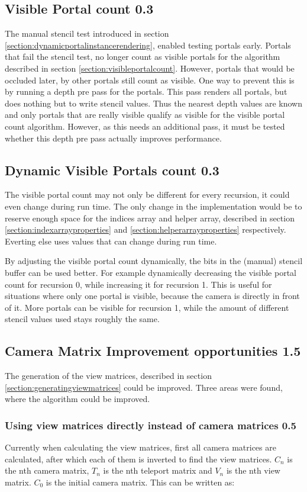 \subsection{Visible Portal count 0.3}
The manual stencil test introduced in section \ref{section:dynamicportalinstancerendering}, enabled testing portals early. Portals that fail the stencil test, no longer count as visible portals for the algorithm described in section \ref{section:visibleportalcount}. However, portals that would be occluded later, by other portals still count as visible. One way to prevent this is by running a depth pre pass for the portals. This pass renders all portals, but does nothing but to write stencil values. Thus the nearest depth values are known and only portals that are really visible qualify as visible for the visible portal count algorithm. However, as this needs an additional pass, it must be tested whether this depth pre pass actually improves performance.

\subsection{Dynamic Visible Portals count 0.3}
The visible portal count may not only be different for every recursion, it could even change during run time. The only change in the implementation would be to reserve enough space for the indices array and helper array, described in section \ref{section:indexarrayproperties} and \ref{section:helperarrayproperties} respectively. Everting else uses values that can change during run time.

By adjusting the visible portal count dynamically, the bits in the (manual) stencil buffer can be used better. For example dynamically decreasing the visible portal count for recursion 0, while increasing it for recursion 1. This is useful for situations where only one portal is visible, because the camera is directly in front of it. More portals can be visible for recursion 1, while the amount of different stencil values used stays roughly the same.


\subsection{Camera Matrix Improvement opportunities 1.5}
The generation of the view matrices, described in section \ref{section:generatingviewmatrices} could be improved. Three areas were found, where the algorithm could be improved.

\subsubsection{Using view matrices directly instead of camera matrices 0.5}
Currently when calculating the view matrices, first all camera matrices are calculated, after which each of them is inverted to find the view matrices. $C_n$ is the nth camera matrix, $T_n$ is the nth teleport matrix and $V_n$ is the nth view matrix. $C_0$ is the initial camera matrix. This can be written as:

